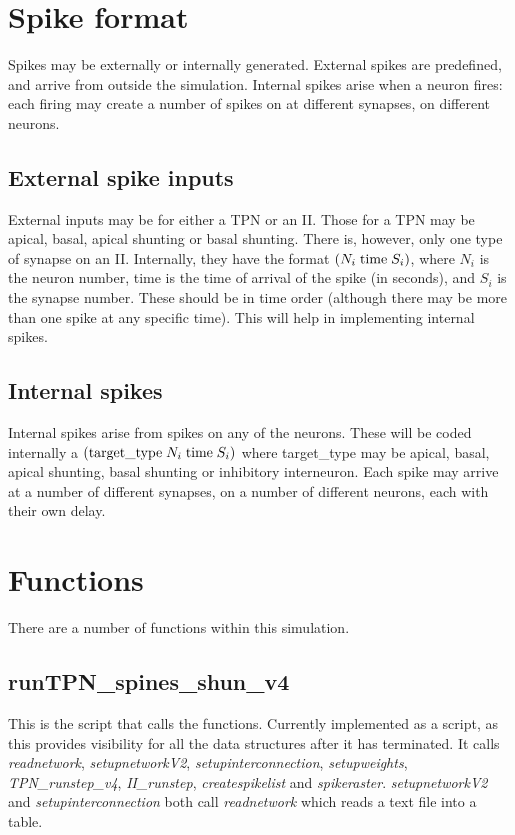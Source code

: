 \documentclass[11pt, oneside]{article}   	%
\begin{document}
\section{Spike format}
Spikes may be externally or internally generated. External spikes are predefined, and arrive from outside the simulation. Internal spikes arise when a neuron fires: each firing may create a number of spikes on at different synapses, on different neurons. 

\subsection{External spike inputs}
External inputs may be for either a TPN or an II. Those for a TPN may be apical, basal, apical shunting or basal shunting. There is, however, only one type of synapse on an II. Internally, they have the format $(N_i \; {\rm time} \; S_i)$, where $N_i$ is the neuron number, time is the time of arrival of the spike (in seconds), and $S_i$ is the synapse number. These should be in time order (although there may be more than one spike at any specific time). This will help in implementing internal spikes. 

\subsection{Internal spikes}
Internal spikes arise from spikes on any of the neurons. These will be coded internally a $({\rm target\_type} \; N_i \; {\rm time} \; S_i)$ where target\_type may be apical, basal, apical shunting, basal shunting or inhibitory interneuron. Each spike may arrive at a number of different synapses, on a number of different neurons, each with their own delay.

\section{Functions}
There are a number of functions within this simulation.

\subsection{runTPN\_spines\_shun\_v4}
This is the script that calls the functions. Currently implemented as a script, as this provides visibility for all the data structures after it has terminated. It calls {\it readnetwork}, {\it setupnetworkV2}, {\it setupinterconnection}, {\it setupweights},  {\it TPN\_runstep\_v4}, {\it II\_runstep}, {\it createspikelist} and {\it spikeraster}.  {\it setupnetworkV2} and {\it setupinterconnection} both call {\it readnetwork} which reads a text file into a table. 
\end{document}
